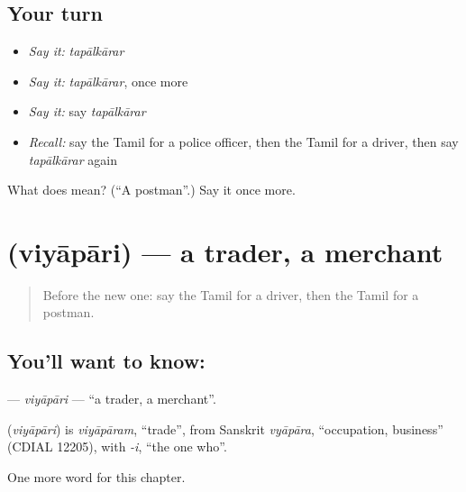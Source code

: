 \subsection*{Your turn}
\begin{itemize}
\raggedright
  \item \emph{Say it:} \emph{tapālkārar}
  \item \emph{Say it:} \emph{tapālkārar}, once more
  \item \emph{Say it:} say \emph{tapālkārar}
  \item \emph{Recall:} say the Tamil for a police officer, then the Tamil for a driver, then say \emph{tapālkārar} again
\end{itemize}

\begin{tcolorbox}[breakable,colback=teal!4,colframe=teal!35!black,title={Before you move on}]
What does  mean? (\textquotedblleft{}A postman\textquotedblright{}.) Say it once more.
\end{tcolorbox}
\section[\texorpdfstring{\ta{வியாபாரி} (viyāpāri)}{வியாபாரி (viyāpāri)}]{ (viyāpāri) — a trader, a merchant}

\label{lesson:TA-C192-viyapari}



\begin{quote}
Before the new one: say the Tamil for a driver, then the Tamil for a postman.
\end{quote}

\subsection*{You'll want to know: }
\textbf{} — \emph{viyāpāri} — \textquotedblleft{}a trader, a merchant\textquotedblright{}.

\begin{cousinweb}
\textbf{} (\emph{viyāpāri}) is \emph{viyāpāram}, \textquotedblleft{}trade\textquotedblright{}, from Sanskrit \emph{vyāpāra}, \textquotedblleft{}occupation, business\textquotedblright{} (CDIAL 12205), with \emph{-i}, \textquotedblleft{}the one who\textquotedblright{}.
\end{cousinweb}

\begin{grammarlens}[title={What you've built}]
One more word for this chapter.
\end{grammarlens}


